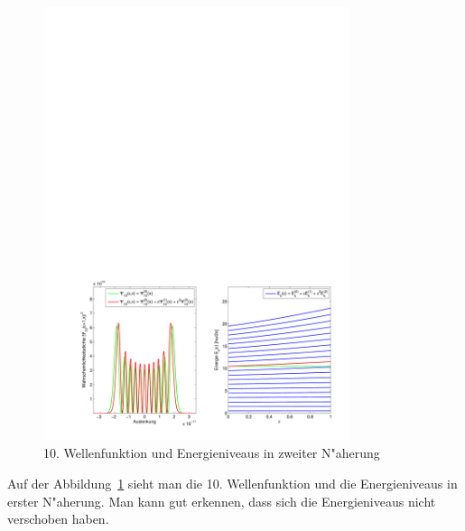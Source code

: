 \begin{refsection}
\begin{figure}	%
\centering
\includegraphics[width=0.8\textwidth]{anharmonisch/images/x4/Stoerung2Wellenfunktion.pdf}
\caption{10. Wellenfunktion und Energieniveaus in zweiter N"aherung
\label{skript:x4_Stoerung1Wellenfunktion}}
\end{figure}

Auf der Abbildung~\ref{skript:x4_Stoerung1Wellenfunktion} sieht man die 10. Wellenfunktion und die Energieniveaus in erster N"aherung. Man kann gut erkennen, dass sich die Energieniveaus nicht verschoben haben.


\end{refsection}
